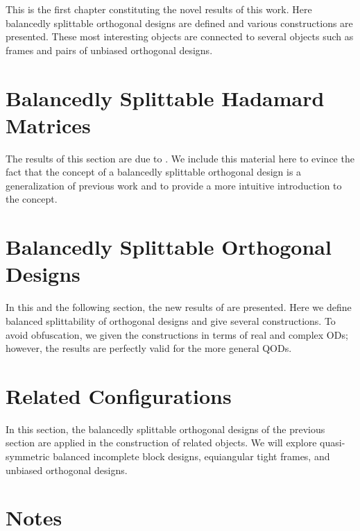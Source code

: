 \documentclass[../../main]{subfiles}
\begin{document}
This is the first chapter constituting the novel results of this work. Here balancedly splittable orthogonal designs are defined and various constructions are presented. These most interesting objects are connected to several objects such as frames and pairs of unbiased orthogonal designs.

 \section{\centering Balancedly Splittable Hadamard Matrices}
 The results of this section are due to \cite{splittable-hadamard}. We include
 this material here to evince the fact that the concept of a balancedly
 splittable orthogonal design is a generalization of previous work and to
 provide a more intuitive introduction to the concept. 
 
 \dinkus
 
 
 
 \section{\centering Balancedly Splittable Orthogonal Designs}
 In this and the following section, the new results of \cite{split-od} are presented. Here we define balanced splittability of orthogonal designs and give several constructions. To avoid obfuscation, we given the constructions in terms of real and complex ODs; however, the results are perfectly valid for the more general QODs.
 
 \dinkus
 
 
 
 \section{\centering Related Configurations}
 In this section, the balancedly splittable orthogonal designs of the previous section are applied in the construction of related objects. We will explore quasi-symmetric balanced incomplete block designs, equiangular tight frames, and unbiased orthogonal designs.
 
 \dinkus
 
 
 
 \singlespace
 
 \section*{\centering Notes}
 \thednotes
 
 \doublespacing
 
 \biblio
\end{document}
